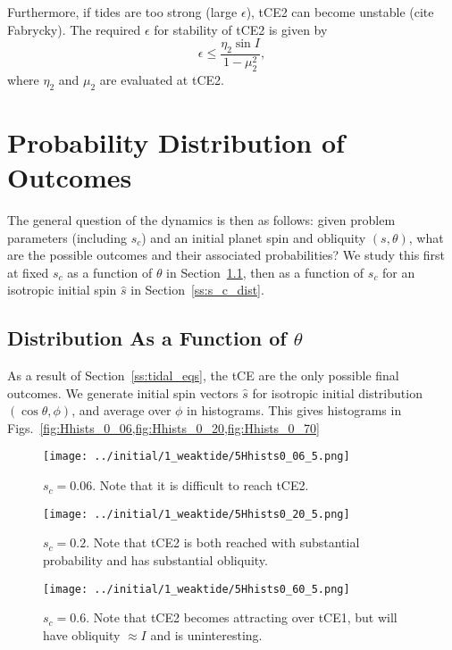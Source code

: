 \documentclass[twocolumn]{aastex63}
\newcommand*{\p}[1]{\left(#1\right)}
\begin{document}
Furthermore, if tides are too strong (large $\epsilon$), tCE2 can become
unstable (cite Fabrycky). The required $\epsilon$ for stability of tCE2 is given
by
\begin{equation}
    \epsilon \leq \frac{\eta_2 \sin I}{1 - \mu_2^2},
\end{equation}
where $\eta_2$ and $\mu_2$ are evaluated at tCE2.

\section{Probability Distribution of Outcomes}\label{s:sim}

The general question of the dynamics is then as follows: given problem
parameters (including $s_c$) and an initial planet spin and obliquity $(s,
\theta)$, what are the possible outcomes and their associated probabilities? We
study this first at fixed $s_c$ as a function of $\theta$ in
Section~\ref{ss:q_dist}, then as a function of $s_c$ for an isotropic initial
spin $\hat{s}$ in Section~\ref{ss:s_c_dist}.

\subsection{Distribution As a Function of $\theta$}\label{ss:q_dist}

As a result of Section~\ref{ss:tidal_eqs}, the tCE are the only possible final
outcomes. We generate initial spin vectors $\hat{s}$ for isotropic initial
distribution $\p{\cos \theta, \phi}$, and average over $\phi$ in histograms.
This gives histograms in
Figs.~\ref{fig:Hhists_0_06,fig:Hhists_0_20,fig:Hhists_0_70}
\begin{figure}
    \centering
    \texttt{[image: ../initial/1\_weaktide/5Hhists0\_06\_5.png]}
    \caption{$s_c = 0.06$. Note that it is difficult to reach
    tCE2.}\label{fig:Hhists_0_06}
\end{figure}
\begin{figure}
    \centering
    \texttt{[image: ../initial/1\_weaktide/5Hhists0\_20\_5.png]}
    \caption{$s_c = 0.2$. Note that tCE2 is both reached with substantial
    probability and has substantial obliquity.}\label{fig:Hhists_0_20}
\end{figure}
\begin{figure}
    \centering
    \texttt{[image: ../initial/1\_weaktide/5Hhists0\_60\_5.png]}
    \caption{$s_c = 0.6$. Note that tCE2 becomes attracting over tCE1, but will
    have obliquity $\approx I$ and is uninteresting.}\label{fig:Hhists_0_70}
\end{figure}
\end{document}
